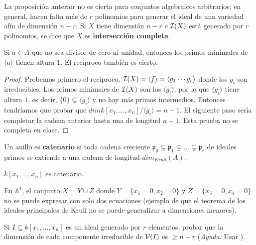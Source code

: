 \documentclass[ACGA.tex]{subfiles}
\begin{document}
La proposición anterior no es cierta para conjuntos algebraicos arbitrarios: en general, hacen falta más de $r$ polinomios para generar el ideal de una variedad afín de dimensión $n-r$. Si $X$ tiene dimensión $n-r$ e $\mathcal{I}(X)$ está generado por $r$ polinomios, se dice que $X$ es {\bf intersección completa}.

\begin{teorema}
Si $a\in A$ que no sea divisor de cero ni unidad, entonces los primos minimales de $\langle a\rangle$ tienen altura $1$. El recíproco también es cierto.
\end{teorema}
\begin{proof}
Probemos primero el recíproco. $\mathcal{I}(X)=\langle f\rangle =\langle g_1\cdots g_r\rangle$ donde los $g_i$ son irreducibles. Los primos minimales de $\mathcal{I}(X)$ son los $\langle g_i\rangle$, por lo que $\langle g_i\rangle$ tiene altura $1$, es decir, $\{0\}\subsetneq \langle g_i\rangle$ y no hay más primos intermedios. Entonces tendríamos que probar que $dim k[x_1,\dots,x_n]/\langle g_i\rangle =n-1$. El siguiente paso sería completar la cadena anterior hasta una de longitud $n-1$. Esta prueba no se completa en clase.
\end{proof}

\begin{defi}
Un anillo es {\bf catenario } si toda cadena creciente $\mathfrak{p}_0\subsetneq\mathfrak{p}_1\subsetneq\dots\subsetneq\mathfrak{p}_r$ de ideales primos se extiende a una cadena de longitud $dim_{Krull}(A)$. 
\end{defi}

\begin{teorema}
$k[x_1,\dots,x_n]$ es catenario.
\end{teorema}

\begin{ejer}
En $\mathbb{A}^4$, el conjunto $X=Y\cup Z$ donde $Y=\{x_1=0,x_2=0\}$ y $Z=\{x_3=0,x_4=0\}$ no se puede expresar con solo dos ecuaciones (ejemplo de que el teorema de los ideales principales de Krull no se puede generalizar a dimensiones menores). 
\end{ejer}



\begin{ejer}\label{dimensionmayor}
 Si $I\subseteq k[x_1,\ldots,x_n]$ es un ideal generado por $r$ elementos, probar que la dimensión de cada componente irreducible de $\mathcal{V}(I)$ es $\geq n-r$ (\emph{Ayuda:} Usar \cite[corolario 1.16]{am}).
\end{ejer}
\end{document}
